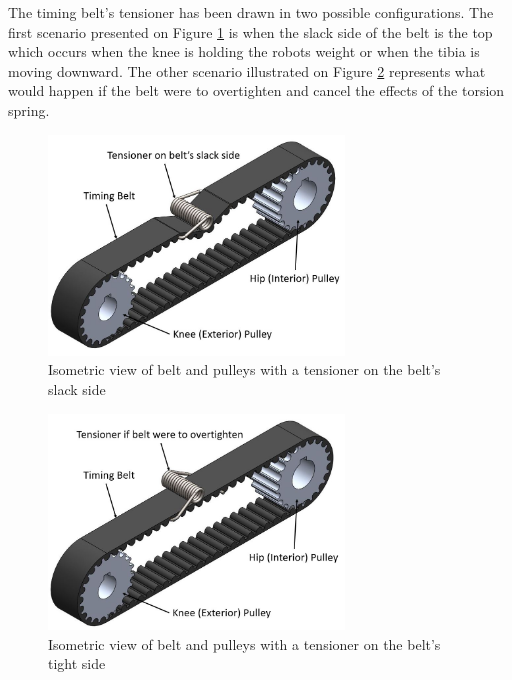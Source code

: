 The timing belt's tensioner has been drawn in two possible configurations. The first scenario presented on Figure \ref{fig:beltSlack} is when the slack side of the belt is the top which occurs when the knee is holding the robots weight or when the tibia is moving downward. The other scenario illustrated on Figure \ref{fig:beltTight} represents what would happen if the belt were to overtighten and cancel the effects of the torsion spring.

\begin{figure}
    \centering
    \includegraphics[width=0.7\textwidth]{2_DetailedDesign/img/BeltPulleySlack_a.JPG}
    \caption{Isometric view of belt and pulleys with a tensioner on the belt's slack side}
    \label{fig:beltSlack}
\end{figure}

\begin{figure}
    \centering
    \includegraphics[width=0.7\textwidth]{2_DetailedDesign/img/BeltPulleyTight_a.JPG}
    \caption{Isometric view of belt and pulleys with a tensioner on the belt's tight side}
    \label{fig:beltTight}
\end{figure}
